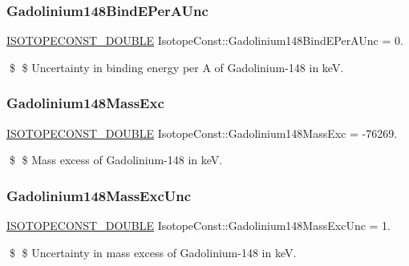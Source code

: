 \subsubsection{\texorpdfstring{Gadolinium148\+Bind\+E\+Per\+A\+Unc}{Gadolinium148BindEPerAUnc}}
{\footnotesize\ttfamily \mbox{\hyperlink{group___isotope_const-_macros_ga8f45a7272ce02c0b4c65c44636ed719a}{I\+S\+O\+T\+O\+P\+E\+C\+O\+N\+S\+T\+\_\+\+D\+O\+U\+B\+LE}} Isotope\+Const\+::\+Gadolinium148\+Bind\+E\+Per\+A\+Unc = 0.}

\$ \$ Uncertainty in binding energy per A of Gadolinium-\/148 in keV. \mbox{\label{group___isotope_const-_gadolinium-_gd148_gabfb06712b2a62499b42a3c1f99749a0a}} 
\subsubsection{\texorpdfstring{Gadolinium148\+Mass\+Exc}{Gadolinium148MassExc}}
{\footnotesize\ttfamily \mbox{\hyperlink{group___isotope_const-_macros_ga8f45a7272ce02c0b4c65c44636ed719a}{I\+S\+O\+T\+O\+P\+E\+C\+O\+N\+S\+T\+\_\+\+D\+O\+U\+B\+LE}} Isotope\+Const\+::\+Gadolinium148\+Mass\+Exc = -\/76269.}

\$ \$ Mass excess of Gadolinium-\/148 in keV. \mbox{\label{group___isotope_const-_gadolinium-_gd148_gac7e19252ba81d683f81c8f9f6f22a0c8}} 
\subsubsection{\texorpdfstring{Gadolinium148\+Mass\+Exc\+Unc}{Gadolinium148MassExcUnc}}
{\footnotesize\ttfamily \mbox{\hyperlink{group___isotope_const-_macros_ga8f45a7272ce02c0b4c65c44636ed719a}{I\+S\+O\+T\+O\+P\+E\+C\+O\+N\+S\+T\+\_\+\+D\+O\+U\+B\+LE}} Isotope\+Const\+::\+Gadolinium148\+Mass\+Exc\+Unc = 1.}

\$ \$ Uncertainty in mass excess of Gadolinium-\/148 in keV. \mbox{\label{group___isotope_const-_gadolinium-_gd148_ga9bcb31fbf992c22aadc687a11eb73223}} 
